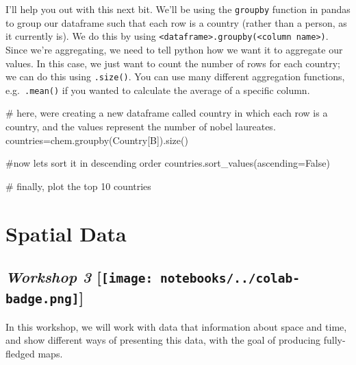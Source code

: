 \documentclass[
  letterpaper,
  DIV=11,
  numbers=noendperiod]{scrreprt}
\newenvironment{Shaded}{\begin{snugshade}}{\end{snugshade}}
\newcommand{\CommentTok}[1]{\textcolor[rgb]{0.37,0.37,0.37}{#1}}
\newcommand{\NormalTok}[1]{\textcolor[rgb]{0.00,0.23,0.31}{#1}}
\newcommand{\OperatorTok}[1]{\textcolor[rgb]{0.37,0.37,0.37}{#1}}
\newcommand{\StringTok}[1]{\textcolor[rgb]{0.13,0.47,0.30}{#1}}
\newcommand{\VariableTok}[1]{\textcolor[rgb]{0.07,0.07,0.07}{#1}}
\begin{document}
I'll help you out with this next bit. We'll be using the
\texttt{groupby} function in pandas to group our dataframe such that
each row is a country (rather than a person, as it currently is). We do
this by using
\texttt{\textless{}dataframe\textgreater{}.groupby(\textquotesingle{}\textless{}column\ name\textgreater{}\textquotesingle{})}.
Since we're aggregating, we need to tell python how we want it to
aggregate our values. In this case, we just want to count the number of
rows for each country; we can do this using \texttt{.size()}. You can
use many different aggregation functions, e.g.~\texttt{.mean()} if you
wanted to calculate the average of a specific column.

\begin{Shaded}
\begin{Highlighting}[]
\CommentTok{\# here, we\textquotesingle{}re creating a new dataframe called \textquotesingle{}country\textquotesingle{} in which each row is a country, and the values represent the number of nobel laureates. }
\NormalTok{countries}\OperatorTok{=}\NormalTok{chem.groupby(}\StringTok{\textquotesingle{}Country[B]\textquotesingle{}}\NormalTok{).size()}

\CommentTok{\#now let\textquotesingle{}s sort it in descending order}
\NormalTok{countries.sort\_values(ascending}\OperatorTok{=}\VariableTok{False}\NormalTok{)}

\CommentTok{\# finally, plot the top 10 countries }
\end{Highlighting}
\end{Shaded}


\hypertarget{spatial-data}{%
\chapter{Spatial Data}\label{spatial-data}}

\hypertarget{workshop-3-open-in-colab}{%
\section[\emph{Workshop 3} {[}{]}]{\texorpdfstring{\emph{Workshop 3}
{[}\protect\texttt{[image: notebooks/../colab-badge.png]}{]}}{Workshop 3 {[}Open In Colab{]}}}\label{workshop-3-open-in-colab}}

In this workshop, we will work with data that information about space
and time, and show different ways of presenting this data, with the goal
of producing fully-fledged maps.
\end{document}
